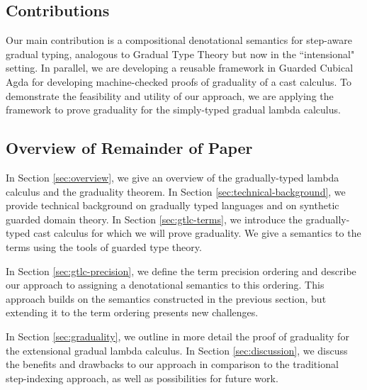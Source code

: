 \subsection{Contributions}
Our main contribution is a compositional denotational semantics for step-aware gradual typing,
analogous to Gradual Type Theory but now in the ``intensional" setting.
In parallel, we are developing a reusable framework in
Guarded Cubical Agda for developing machine-checked proofs of graduality of a cast calculus.
To demonstrate the feasibility and utility of our approach, we are applying the framework
to prove graduality for the simply-typed gradual lambda calculus.


\subsection{Overview of Remainder of Paper}

In Section \ref{sec:overview}, we give an overview of the gradually-typed lambda
calculus and the graduality theorem.
%
In Section \ref{sec:technical-background}, we provide technical background on gradually typed languages and
on synthetic guarded domain theory.
% 
In Section \ref{sec:gtlc-terms}, we introduce the gradually-typed cast calculus
for which we will prove graduality. We give a semantics to the terms
using the tools of guarded type theory.
%

In Section \ref{sec:gtlc-precision}, we define the term precision ordering
and describe our approach to assigning a denotational semantics to this ordering.
This approach builds on the semantics constructed in the previous section,
but extending it to the term ordering presents new challenges.


%
%
In Section \ref{sec:graduality}, we outline in more detail the proof of graduality for the
extensional gradual lambda calculus.
%
In Section \ref{sec:discussion}, we discuss the benefits and drawbacks to our approach in comparison
to the traditional step-indexing approach, as well as possibilities for future work.




